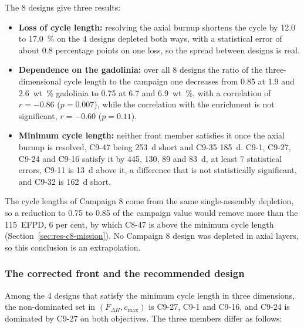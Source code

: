 The 8 designs give three results:

\begin{itemize}
  \item \textbf{Loss of cycle length:} resolving the axial burnup
        shortens the cycle by 12.0 to \SI{17.0}{\%} on the 4 designs
        depleted both ways, with a statistical error of about 0.8
        percentage points on one loss, so the spread between designs is
        real.
  \item \textbf{Dependence on the gadolinia:} over all 8 designs the
        ratio of the three-dimensional cycle length to the campaign one
        decreases from 0.85 at 1.9 and \SI{2.6}{wt\%} gadolinia to 0.75
        at 6.7 and \SI{6.9}{wt\%}, with a correlation of $r = -0.86$
        ($p = 0.007$), while the correlation with the enrichment is not
        significant, $r = -0.60$ ($p = 0.11$).
  \item \textbf{Minimum cycle length:} neither front member satisfies
        it once the axial burnup is resolved, C9-47 being \SI{253}{d}
        short and C9-35 \SI{185}{d}. C9-1, C9-27, C9-24 and C9-16
        satisfy it by 445, 130, 89 and \SI{83}{d}, at least 7
        statistical errors, C9-11 is \SI{13}{d} above it, a difference
        that is not statistically significant, and C9-32 is \SI{162}{d}
        short.
\end{itemize}

The cycle lengths of Campaign 8 come from the same single-assembly
depletion, so a reduction to 0.75 to 0.85 of the campaign value would
remove more than the \SI{115}{EFPD}, 6 per cent, by which C8-47 is
above the minimum cycle length (Section~\ref{sec:res-c8-mission}). No
Campaign 8 design was depleted in axial layers, so this conclusion is
an extrapolation.

\subsubsection{The corrected front and the recommended design}
\label{sec:res-c9-axial-front}
Among the 4 designs that satisfy the minimum cycle length in three
dimensions, the non-dominated set in $(F_{\Delta H}, c_\mathrm{max})$
is C9-27, C9-1 and C9-16, and C9-24 is dominated by C9-27 on both
objectives. The three members differ as follows:

